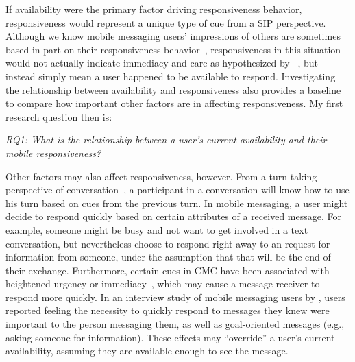 \documentclass[12pt]{nuthesis}	%
\begin{document}

If availability were the primary factor driving responsiveness behavior, responsiveness would represent a unique type of cue from a SIP perspective. Although we know mobile messaging users' impressions of others are sometimes based in part on their responsiveness behavior~\citep{church2013s}, responsiveness in this situation would not actually indicate immediacy and care as hypothesized by ~\citet{walther1995nonverbal}, but instead simply mean a user happened to be available to respond. Investigating the relationship between availability and responsiveness also provides a baseline to compare how important other factors are in affecting responsiveness. My first research question then is:

\textit{RQ1: What is the relationship between a user's current availability and their mobile responsiveness?}

Other factors may also affect responsiveness, however. From a turn-taking perspective of conversation~\citep{sacks1974simplest}, a participant in a conversation will know how to use his turn based on  cues from the previous turn. In mobile messaging, a user might decide to respond quickly based on certain attributes of a received message. For example, someone might be busy and not want to get involved in a text conversation, but nevertheless choose to respond right away to an request for information from someone, under the assumption that that will be the end of their exchange. Furthermore, certain cues in CMC have been associated with heightened urgency or immediacy~\citep{nguyen2014lexical}, which may cause a message receiver to respond more quickly. In an interview study of mobile messaging users by \citet{cui2016beyond}, users reported feeling the necessity to quickly respond to messages they knew were important to the person messaging them, as well as goal-oriented messages (e.g., asking someone for information). These effects may ``override'' a user's current availability, assuming they are available enough to see the message.
\end{document}
